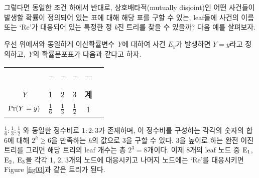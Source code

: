 \documentclass[11pt]{article}
\begin{document}
그렇다면 동일한 조건 하에서 반대로, 상호배타적(mutually disjoint)인 어떤 사건들이 발생할 확률이 정의되어 있는 표에 대해 해당 표를 구할 수 있는, leaf들에 사건의 이름 또는 `Re'가 대응되어 있는 특정한 정 \textit{k}진 트리를 찾을 수 있을까? 다음 예를 살펴보자.

우선 위에서와 동일하게 이산확률변수 \textit{Y}에 대하여 사건 $E_{y}$가 발생하면 $Y=y$라고 정의하고, \textit{Y}의 확률분포표가 다음과 같다고 하자.
\\
\begin{table}[h]
\centering
\begin{tabular}{cccccc}
\toprule
 & \rule{0.8cm}{0pt} & \rule{0.3cm}{0pt} & \rule{0.8cm}{0pt} & \rule{0.4cm}{0pt} \\[-\arraystretch\normalbaselineskip]
\textit{Y} & 1 & 2 & 3 & \textbf{계} \\
\midrule
$\textnormal{Pr}(Y=y)$ & $\displaystyle \frac{1}{6}$ & $\displaystyle \frac{1}{3}$ & $\displaystyle \frac{1}{2}$ &  1 \\
\bottomrule
\end{tabular}
\end{table}

\noindent $\frac{1}{6}:\frac{1}{3}:\frac{1}{2}$ 와 동일한 정수비로 $1:2:3$가 존재하며, 이 정수비를 구성하는 각각의 숫자의 합 6에 대해 $2^{h} \ge 6$을 만족하는 \textit{h}의 값으로 3을 구할 수 있다. 3을 높이로 하는 완전 이진 트리를 그리면 해당 트리의 leaf 개수는 총 $2^{3}=8$개이다. 이제 8개의 leaf 노드 중 $\textnormal{E}_{1}$, $\textnormal{E}_{2}$, $\textnormal{E}_{3}$을 각각 1, 2, 3개의 노드에 대응시키고 나머지 노드에는 `Re'를 대응시키면 Figure \ref{fig03}과 같은 트리가 된다.
\end{document}
